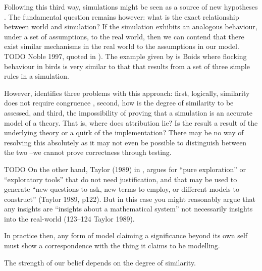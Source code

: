 Following this third way, simulations might be seen as a source of new
hypotheses \autocite{Eldridge}. The fundamental question remains
however: what is the exact relationship between world and simulation? If
the simulation exhibits an analogous behaviour, under a set of
assumptions, to the real world, then we can contend that there exist
similar mechanisms in the real world to the assumptions in our model.
TODO Noble 1997, quoted in \autocite{Eldridge}). The example given by
\autocite{Eldridge} is Boids \autocite{Reynolds1987} where flocking behaviour in
birds is very similar to that that results from a set of three simple
rules in a simulation.

However, \autocite{Eldridge} identifies three problems with this
approach: first, logically, similarity does not require congruence
\autocite{Weitzenfeld1984}, second, how is the degree of similarity to
be assessed, and third, the impossibility of proving that a simulation
is an accurate model of a theory. That is, where does attribution lie?
Is the result a result of the underlying theory or a quirk of the
implementation? There may be no way of resolving this absolutely as it
may not even be possible to distinguish between the two
\autocite{DiPaolo2000}--we cannot prove correctness through testing.

TODO On the other hand, Taylor (1989) in \autocite{Webb2009}, argues for
``pure exploration'' or ``exploratory tools'' that do not need
justification, and that may be used to generate ``new questions to ask,
new terms to employ, or different models to construct'' (Taylor 1989,
p122). But in this case you might reasonably argue that any insights are
``insights about a mathematical system'' not necessarily insights into
the real-world (123–124 Taylor 1989).

In practice then, any form of model claiming a significance beyond its
own self must show a correspondence with the thing it claims to be
modelling.

The strength of our belief depends on the degree of similarity.

